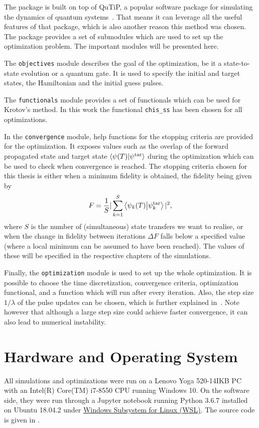 \documentclass[main.tex]{subfiles}
\begin{document}
The package is built on top of QuTiP, a popular software package for simulating the dynamics of quantum systems~\cite{johansson_qutip_2013}.
That means it can leverage all the useful features of that package, which is also another reason this method was chosen.
The package provides a set of submodules which are used to set up the optimization problem.
The important modules will be presented here.

The \texttt{objectives} module describes the goal of the optimization, be it a state-to-state evolution or a quantum gate.
It is used to specify the initial and target states, the Hamiltonian and the initial guess pulses.

The \texttt{functionals} module provides a set of functionals which can be used for Krotov's method.
In this work the functional \texttt{chis\_ss} has been chosen for all optimizations.

In the \texttt{convergence} module, help functions for the stopping criteria are provided for the optimization.
It exposes values such as the overlap of the forward propagated state and target state \(\braket{\psi(T)}{\psi^{\text{tar}}}\) during the optimization which can be used to check when convergence is reached.
The stopping criteria chosen for this thesis is either when a minimum fidelity is obtained, the fidelity being given by~\cite{ofek_extending_2016}
\begin{equation}
    F = \frac{1}{S}|\sum_{k=1}^{S} \braket{\psi_k(T)}{\psi_{k}^{\text{tar}}}|^2,
    \label{eq:total-fidelity}
\end{equation}
where \(S\) is the number of (simultaneous) state transfers we want to realise, or when the change in fidelity between iterations \(\Delta F\) falls below a specified value (where a local minimum can be assumed to have been reached).
The values of these will be specified in the respective chapters of the simulations.

Finally, the \texttt{optimization} module is used to set up the whole optimization.
It is possible to choose the time discretization, convergence criteria, optimization functional, and a function which will run after every iteration.
Also, the step size \(1/\lambda\) of the pulse updates can be chosen, which is further explained in~\cite{goerz_krotov:_2019}.
Note however that although a large step size could achieve faster convergence, it can also lead to numerical instability.

\section{Hardware and Operating System}
All simulations and optimizations were run on a Lenovo Yoga 520-14IKB PC with an Intel(R) Core(TM) i7-8550 CPU running Windows 10.
On the software side, they were run through a Jupyter notebook running Python 3.6.7 installed on Ubuntu 18.04.2 under \href{https://docs.microsoft.com/en-us/windows/wsl/faq}{Windows Subsystem for Linux (WSL)}.
The source code is given in .
\end{document}
